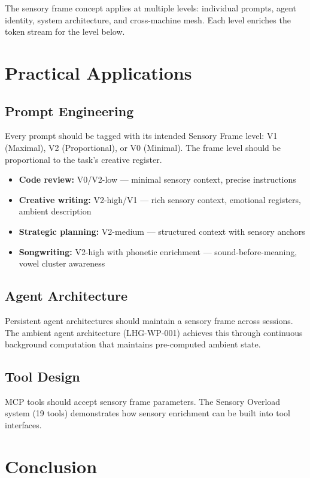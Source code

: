 \documentclass[11pt,a4paper]{article}
\begin{document}
The sensory frame concept applies at multiple levels: individual prompts, agent identity, system architecture, and cross-machine mesh. Each level enriches the token stream for the level below.

\section{Practical Applications}

\subsection{Prompt Engineering}

Every prompt should be tagged with its intended Sensory Frame level: V1 (Maximal), V2 (Proportional), or V0 (Minimal). The frame level should be proportional to the task's creative register.

\begin{itemize}
    \item \textbf{Code review:} V0/V2-low --- minimal sensory context, precise instructions
    \item \textbf{Creative writing:} V2-high/V1 --- rich sensory context, emotional registers, ambient description
    \item \textbf{Strategic planning:} V2-medium --- structured context with sensory anchors
    \item \textbf{Songwriting:} V2-high with phonetic enrichment --- sound-before-meaning, vowel cluster awareness
\end{itemize}

\subsection{Agent Architecture}

Persistent agent architectures should maintain a sensory frame across sessions. The ambient agent architecture (LHG-WP-001) achieves this through continuous background computation that maintains pre-computed ambient state.

\subsection{Tool Design}

MCP tools should accept sensory frame parameters. The Sensory Overload system (19 tools) demonstrates how sensory enrichment can be built into tool interfaces.

\section{Conclusion}
\end{document}
